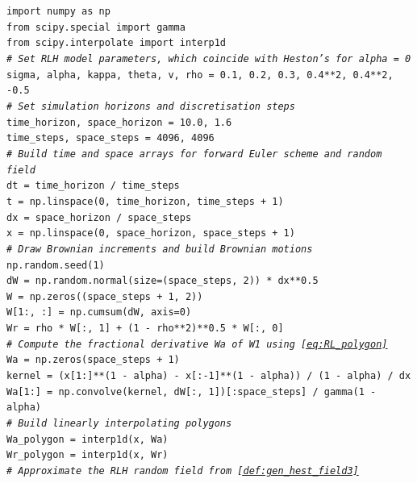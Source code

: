 \vspace{-2mm}
\begin{linenumbers}
\texttt{import numpy as np\\
from scipy.special import gamma\\
from scipy.interpolate import interp1d\\
{\color{alt3}\emph{\# Set RLH model parameters, which coincide with Heston's for alpha = 0}}\\
sigma, alpha, kappa, theta, v, rho = 0.1, 0.2, 0.3, 0.4**2, 0.4**2, -0.5\\
{\color{alt3}\emph{\# Set simulation horizons and discretisation steps}}\\
time\_horizon, space\_horizon = 10.0, 1.6\\
time\_steps, space\_steps = 4096, 4096\\
{\color{alt3}\emph{\# Build time and space arrays for forward Euler scheme and random field}}\\
dt = time\_horizon / time\_steps\\
t = np.linspace(0, time\_horizon, time\_steps + 1)\\
dx = space\_horizon / space\_steps\\
x = np.linspace(0, space\_horizon, space\_steps + 1)\\
{\color{alt3}\emph{\# Draw Brownian increments and build Brownian motions}}\\
np.random.seed(1)\\
dW = np.random.normal(size=(space\_steps, 2)) * dx**0.5\\
W = np.zeros((space\_steps + 1, 2))\\
W[1:, :]~= np.cumsum(dW, axis=0)\\
Wr = rho * W[:, 1] + (1 - rho**2)**0.5 * W[:, 0]\\
{\color{alt3}\emph{\# Compute the fractional derivative Wa of W1 using \autoref{eq:RL_polygon}}}\\
Wa = np.zeros(space\_steps + 1)\\
kernel = (x[1:]**(1 - alpha) - x[:-1]**(1 - alpha)) / (1 - alpha) / dx\\
Wa[1:]~= np.convolve(kernel, dW[:, 1])[:space\_steps] / gamma(1 - alpha)\\
{\color{alt3}\emph{\# Build linearly interpolating polygons}}\\
Wa\_polygon = interp1d(x, Wa)\\
Wr\_polygon = interp1d(x, Wr)\\
{\color{alt3}\emph{\# Approximate the RLH random field from \autoref{def:gen_hest_field3}}}\\
}
\end{linenumbers}
